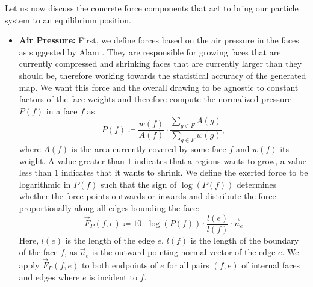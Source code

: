 Let us now discuss the concrete force components that act to bring our particle system to an equilibrium position.
%
\begin{itemize}
	\item \textbf{Air Pressure:}
	First, we define forces based on the air pressure in the faces as suggested by Alam \etal{} \cite{alam2013computing}. They are responsible for growing faces that are currently compressed and shrinking faces that are currently larger than they should be, therefore working towards the statistical accuracy of the generated map. We want this force and the overall drawing to be agnostic to constant factors of the face weights and therefore compute the normalized pressure $P(f)$ in a face $f$ as
	\begin{equation*}
		P(f) \coloneqq \frac{w(f)}{A(f)} \cdot \frac{\sum\limits_{g \in F}{A(g)}}{\sum\limits_{g \in F}{w(g)}},
	\end{equation*}
	where $A(f)$ is the area currently covered by some face $f$ and $w(f)$ its weight. A value greater than $1$ indicates that a regions wants to grow, a value less than $1$ indicates that it wants to shrink. We define the exerted force to be logarithmic in $P(f)$ such that the sign of $\log(P(f))$ determines whether the force points outwards or inwards and distribute the force proportionally along all edges bounding the face:
	\begin{equation}
		\vec{F}_P(f,e) \coloneqq 10 \cdot \log(P(f)) \cdot \frac{l(e)}{l(f)} \cdot \vec{n}_e
	\end{equation}
	Here, $l(e)$ is the length of the edge $e$, $l(f)$ is the length of the boundary of the face $f$, as $\vec{n}_e$ is the outward-pointing normal vector of the edge $e$. We apply $\vec{F}_P(f,e)$ to both endpoints of $e$ for all pairs $(f,e)$ of internal faces and edges where $e$ is incident to $f$.


\end{itemize}
